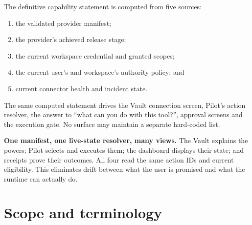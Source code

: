 \documentclass[11pt,a4paper]{article}
\begin{document}
The definitive capability statement is computed from five sources:

\begin{enumerate}
  \item the validated provider manifest;
  \item the provider's achieved release stage;
  \item the current workspace credential and granted scopes;
  \item the current user's and workspace's authority policy; and
  \item current connector health and incident state.
\end{enumerate}

The same computed statement drives the Vault connection screen, Pilot's action
resolver, the answer to ``what can you do with this tool?'', approval screens
and the execution gate. No surface may maintain a separate hard-coded list.

\begin{rulebox}
\textbf{One manifest, one live-state resolver, many views.} The Vault explains
the powers; Pilot selects and executes them; the dashboard displays their state;
and receipts prove their outcomes. All four read the same action IDs and current
eligibility. This eliminates drift between what the user is promised and what
the runtime can actually do.
\end{rulebox}

\section{Scope and terminology}
\end{document}
